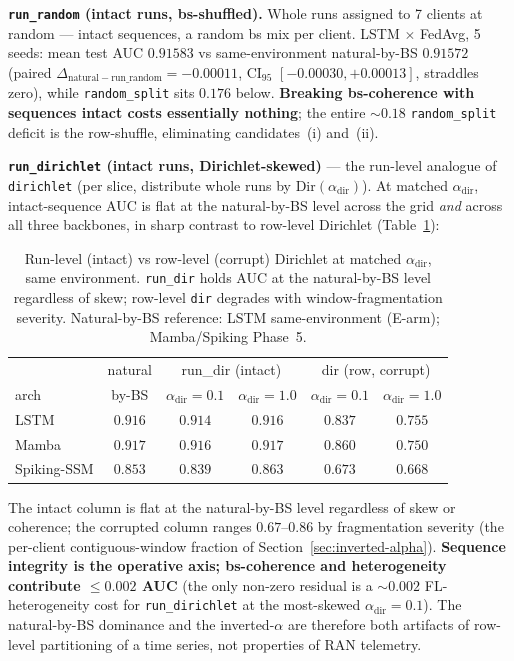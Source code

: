 \documentclass[journal]{IEEEtran}
\newcommand{\alphadir}{\ensuremath{\alpha_{\mathrm{dir}}}}
\begin{document}
\textbf{\lstinline|run_random| (intact runs, bs-shuffled).} Whole runs assigned to 7 clients at random --- intact sequences, a random bs mix per client. LSTM $\times$ FedAvg, 5 seeds: mean test AUC $0.91583$ vs same-environment natural-by-BS $0.91572$ (paired $\Delta_{\mathrm{natural}-\mathrm{run\_random}} = -0.00011$, CI$_{95}$ $[-0.00030, +0.00013]$, straddles zero), while \lstinline|random_split| sits $0.176$ below. \textbf{Breaking bs-coherence with sequences intact costs essentially nothing}; the entire ${\sim}0.18$ \lstinline|random_split| deficit is the row-shuffle, eliminating candidates~(i) and~(ii).

\textbf{\lstinline|run_dirichlet| (intact runs, Dirichlet-skewed)} --- the run-level analogue of \lstinline|dirichlet| (per slice, distribute whole runs by $\mathrm{Dir}(\alphadir)$). At matched $\alphadir$, intact-sequence AUC is flat at the natural-by-BS level across the grid \emph{and} across all three backbones, in sharp contrast to row-level Dirichlet (Table~\ref{tab:run-vs-row}):

\begin{table}[t]
\caption{Run-level (intact) vs row-level (corrupt) Dirichlet at matched $\alphadir$, same environment. \texttt{run\_dir} holds AUC at the natural-by-BS level regardless of skew; row-level \texttt{dir} degrades with window-fragmentation severity. Natural-by-BS reference: LSTM same-environment (E-arm); Mamba/Spiking Phase~5.}
\label{tab:run-vs-row}
\centering
\begin{tabular}{@{}lccccc@{}}
\toprule
 & natural & \multicolumn{2}{c}{run\_dir (intact)} & \multicolumn{2}{c}{dir (row, corrupt)} \\
arch & by-BS & $\alphadir{=}0.1$ & $\alphadir{=}1.0$ & $\alphadir{=}0.1$ & $\alphadir{=}1.0$ \\
\midrule
LSTM        & $0.916$ & $0.914$ & $0.916$ & $0.837$ & $0.755$ \\
Mamba       & $0.917$ & $0.916$ & $0.917$ & $0.860$ & $0.750$ \\
Spiking-SSM & $0.853$ & $0.839$ & $0.863$ & $0.673$ & $0.668$ \\
\bottomrule
\end{tabular}
\end{table}

The intact column is flat at the natural-by-BS level regardless of skew or coherence; the corrupted column ranges $0.67$--$0.86$ by fragmentation severity (the per-client contiguous-window fraction of Section~\ref{sec:inverted-alpha}). \textbf{Sequence integrity is the operative axis; bs-coherence and heterogeneity contribute $\le 0.002$ AUC} (the only non-zero residual is a ${\sim}0.002$ FL-heterogeneity cost for \lstinline|run_dirichlet| at the most-skewed $\alphadir{=}0.1$). The natural-by-BS dominance and the inverted-$\alpha$ are therefore both artifacts of row-level partitioning of a time series, not properties of RAN telemetry.
\end{document}
